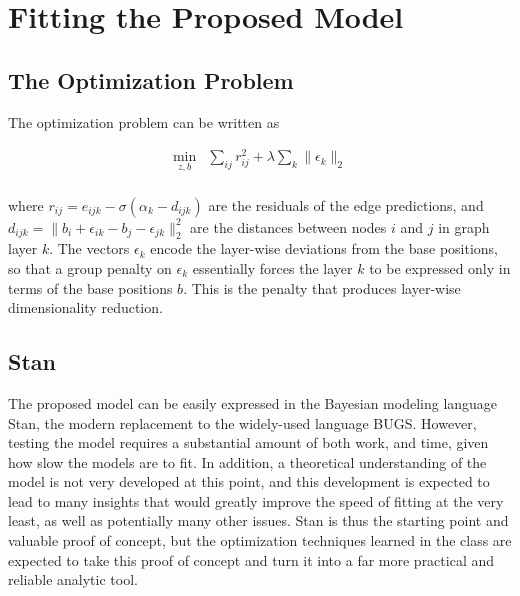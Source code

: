 \documentclass[11pt]{scrartcl}
\begin{document}


\section{Fitting the Proposed Model}
\subsection{The Optimization Problem}
The optimization problem can be written as

\begin{align*}
\min_{z,b} &\sum_{ij} r_{ij}^2 + \lambda \sum_k \|\epsilon_k\|_2\\
\end{align*}

where $r_{ij} = e_{ijk} - \sigma(\alpha_k - d_{ijk})$ are the residuals of the edge predictions, and $d_{ijk} = \|b_i + \epsilon_{ik} - b_j - \epsilon_{jk}\|^2_2$ are the distances between nodes $i$ and $j$ in graph layer $k$. The vectors $\epsilon_k$ encode the layer-wise deviations from the base positions, so that a group penalty on $\epsilon_k$ essentially forces the layer $k$ to be expressed only in terms of the base positions $b$. This is the penalty that produces layer-wise dimensionality reduction.

\subsection{Stan}
The proposed model can be easily expressed in the Bayesian modeling language Stan, the modern replacement to the widely-used language BUGS. However, testing the model requires a substantial amount of both work, and time, given how slow the models are to fit. In addition, a theoretical understanding of the model is not very developed at this point, and this development is expected to lead to many insights that would greatly improve the speed of fitting at the very least, as well as potentially many other issues. Stan is thus the starting point and valuable proof of concept, but the optimization techniques learned in the class are expected to take this proof of concept and turn it into a far more practical and reliable analytic tool. 
\end{document}
